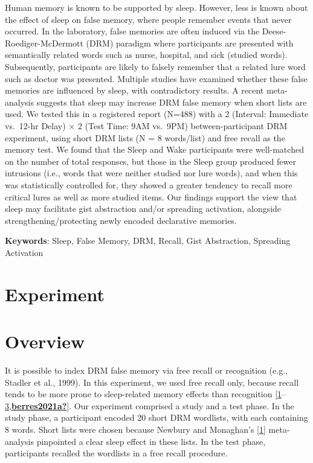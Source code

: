 \documentclass[
]{article}
\begin{document}
Human memory is known to be supported by sleep. However, less is known about the effect of sleep on false memory, where people remember events that never occurred. In the laboratory, false memories are often induced via the Deese-Roediger-McDermott (DRM) paradigm where participants are presented with semantically related words such as nurse, hospital, and sick (studied words). Subsequently, participants are likely to falsely remember that a related lure word such as doctor was presented. Multiple studies have examined whether these false memories are influenced by sleep, with contradictory results. A recent meta-analysis suggests that sleep may increase DRM false memory when short lists are used. We tested this in a registered report (N=488) with a 2 (Interval: Immediate vs.~12-hr Delay) \(\times\) 2 (Test Time: 9AM vs.~9PM) between-participant DRM experiment, using short DRM lists (N = 8 words/list) and free recall as the memory test. We found that the Sleep and Wake participants were well-matched on the number of total responses, but those in the Sleep group produced fewer intrusions (i.e., words that were neither studied nor lure words), and when this was statistically controlled for, they showed a greater tendency to recall more critical lures as well as more studied items. Our findings support the view that sleep may facilitate gist abstraction and/or spreading activation, alongside strengthening/protecting newly encoded declarative memories.

\textbf{Keywords}: Sleep, False Memory, DRM, Recall, Gist Abstraction, Spreading Activation

\hypertarget{experiment}{%
\section*{Experiment}\label{experiment}}

\hypertarget{overview}{%
\section{Overview}\label{overview}}

It is possible to index DRM false memory via free recall or recognition (e.g., Stadler et al., 1999). In this experiment, we used free recall only, because recall tends to be more prone to sleep-related memory effects than recognition {[}\protect\hyperlink{ref-newbury2019a}{1}--\protect\hyperlink{ref-lipinska2019a}{3},\protect\hyperlink{ref-berres2021a}{\textbf{berres2021a?}}{]}. Our experiment comprised a study and a test phase. In the study phase, a participant encoded 20 short DRM wordlists, with each containing 8 words. Short lists were chosen because Newbury and Monaghan's {[}\protect\hyperlink{ref-newbury2019a}{1}{]} meta-analysis pinpointed a clear sleep effect in these lists. In the test phase, participants recalled the wordlists in a free recall procedure.
\end{document}
